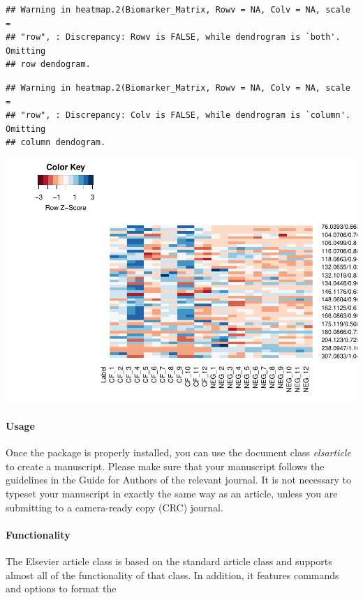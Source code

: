 \documentclass[]{elsarticle} %
\makeatletter
\def\maxwidth{\ifdim\Gin@nat@width>\linewidth\linewidth
\else\Gin@nat@width\fi}
\let\Oldincludegraphics\includegraphics
\renewcommand{\includegraphics}[1]{\Oldincludegraphics[width=\maxwidth]{#1}}
\makeatother
\begin{document}
\begin{verbatim}
## Warning in heatmap.2(Biomarker_Matrix, Rowv = NA, Colv = NA, scale =
## "row", : Discrepancy: Rowv is FALSE, while dendrogram is `both'. Omitting
## row dendogram.
\end{verbatim}

\begin{verbatim}
## Warning in heatmap.2(Biomarker_Matrix, Rowv = NA, Colv = NA, scale =
## "row", : Discrepancy: Colv is FALSE, while dendrogram is `column'. Omitting
## column dendogram.
\end{verbatim}

\includegraphics{FinalDeliverableArticle_files/figure-latex/unnamed-chunk-4-1.pdf}

\hypertarget{usage}{%
\paragraph{Usage}\label{usage}}

Once the package is properly installed, you can use the document class
\emph{elsarticle} to create a manuscript. Please make sure that your
manuscript follows the guidelines in the Guide for Authors of the
relevant journal. It is not necessary to typeset your manuscript in
exactly the same way as an article, unless you are submitting to a
camera-ready copy (CRC) journal.

\hypertarget{functionality}{%
\paragraph{Functionality}\label{functionality}}

The Elsevier article class is based on the standard article class and
supports almost all of the functionality of that class. In addition, it
features commands and options to format the
\end{document}
